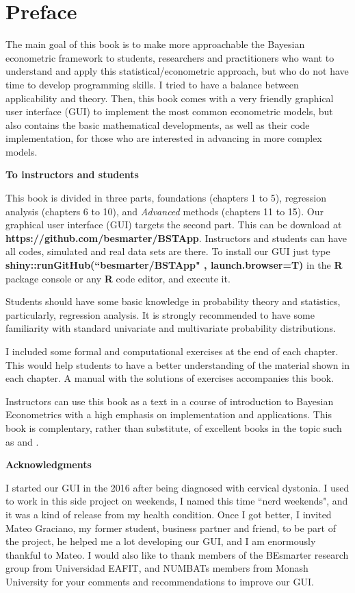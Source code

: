 \chapter*{Preface}
The main goal of this book is to make more approachable the Bayesian econometric framework to students, researchers and practitioners who want to understand and apply this statistical/econometric approach, but who do not have time to develop programming skills. I tried to have a balance between applicability and theory. Then, this book comes with a very friendly graphical user interface (GUI) to implement the most common econometric models, but also contains the basic mathematical developments, as well as their code implementation, for those who are interested in advancing in more complex models.

\textbf{To instructors and students}

This book is divided in three parts, foundations (chapters 1 to 5), regression analysis (chapters 6 to 10), and \textit{Advanced} methods (chapters 11 to 15). Our graphical user interface (GUI) targets the second part. This can be download at \textbf{https://github.com/besmarter/BSTApp}. Instructors and students can have all codes, simulated and real data sets are there. To install our GUI just type \textbf{shiny::runGitHub(``besmarter/BSTApp" , launch.browser=T)} in the \textbf{R} package console or any \textbf{R} code editor, and execute it.

Students should have some basic knowledge in probability theory and statistics, particularly, regression analysis. It is strongly recommended to have some familiarity with standard univariate and multivariate probability distributions.

I included some formal and computational exercises at the end of each chapter. This would help students to have a better understanding of the material shown in each chapter. A manual with the solutions of exercises accompanies this book.

Instructors can use this book as a text in a course of introduction to Bayesian Econometrics with a high emphasis on implementation and applications. This book is complentary, rather than substitute, of excellent books in the topic such as \cite{rossi2012bayesian,greenberg2012introduction, geweke2005contemporary, lancaster2004introduction} and \cite{koop2003bayesian}.

\textbf{Acknowledgments}

I started our GUI in the 2016 after being diagnosed with cervical dystonia. I used to work in this side project on weekends, I named this time ``nerd weekends", and it was a kind of release from my health condition. Once I got better, I invited Mateo Graciano, my former student, business partner and friend, to be part of the project, he helped me a lot developing our GUI, and I am enormously thankful to Mateo. I would also like to thank members of the BEsmarter research group from Universidad EAFIT, and NUMBATs members from Monash University for your comments and recommendations to improve our GUI.

